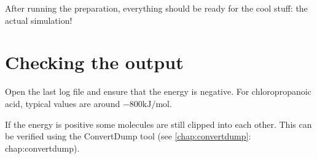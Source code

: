 
After running the preparation, everything should be ready for the cool stuff: 
the actual simulation!

\section{Checking the output}
Open the last log file and ensure that the energy is negative. For 
chloropropanoic acid, typical values are around $-800 \textrm{kJ/mol}$.

If the energy is positive some molecules are still clipped into each other. 
This can be verified using the ConvertDump tool (see \ref{chap:convertdump}: 
\refname{chap:convertdump}).

